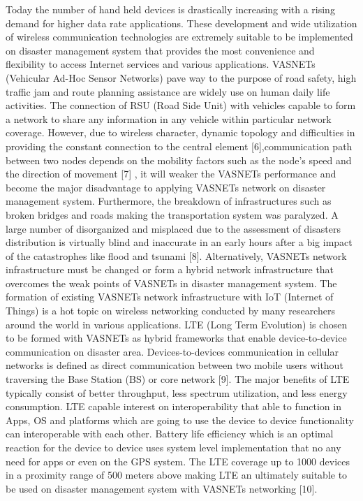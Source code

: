 \documentclass{article}
\begin{document}
Today the number of hand held devices is drastically increasing with a rising demand for higher data rate applications. These development and wide utilization of wireless communication technologies are extremely suitable to be implemented on disaster management system that provides the most convenience and flexibility to access Internet services and various applications. VASNETs (Vehicular Ad-Hoc Sensor Networks) pave way to the purpose of road safety, high traffic jam and route planning assistance are widely use on human daily life activities. The connection of RSU (Road Side Unit) with vehicles capable to form a network to share any information in any vehicle within particular network coverage. However, due to wireless character, dynamic topology and difficulties in providing the constant connection to the central element [6],communication path between two nodes depends on the mobility factors such as the node’s speed and the direction of movement [7] , it will weaker the VASNETs performance and become the major disadvantage to applying VASNETs network on disaster management system. Furthermore, the breakdown of infrastructures such as broken bridges and roads making the transportation system was paralyzed. A large number of disorganized and misplaced due to the assessment of disasters distribution is virtually blind and inaccurate in an early hours after a big impact of the catastrophes like flood and tsunami [8]. Alternatively, VASNETs network infrastructure must be changed or form a hybrid network infrastructure that overcomes the weak points of VASNETs in disaster management system. 
The formation of existing VASNETs network infrastructure with IoT (Internet of Things) is a hot topic on wireless networking conducted by many researchers around the world in various applications. LTE (Long Term Evolution) is chosen to be formed with VASNETs as hybrid frameworks that enable device-to-device communication on disaster area. Devices-to-devices communication in cellular networks is defined as direct communication between two mobile users without traversing the Base Station (BS) or core network [9]. The major benefits of LTE typically consist of better throughput, less spectrum utilization, and less energy consumption. LTE capable interest on interoperability that able to function in Apps, OS and platforms which are going to use the device to device functionality can interoperable with each other. Battery life efficiency which is an optimal reaction for the device to device uses system level implementation that no any need for apps or even on the GPS system. The LTE coverage up to 1000 devices in a proximity range of 500 meters above making LTE an ultimately suitable to be used on disaster management system with VASNETs networking [10]. 
\end{document}
